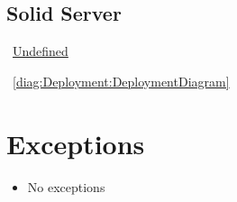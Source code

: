 \subsection{Solid Server}\label{node:DeploymentSolidServer}
	\begin{description}
		\item[Responsibility:]~{\colorbox{red!30}{\underline{Undefined}}}
		\item[Visible on diagrams:]~\cref{diag:Deployment:DeploymentDiagram}		
	\end{description}



\section{Exceptions}\label{sec:exceptions}
\begin{itemize}[nolistsep,noitemsep]
\item[] No exceptions
\end{itemize}

